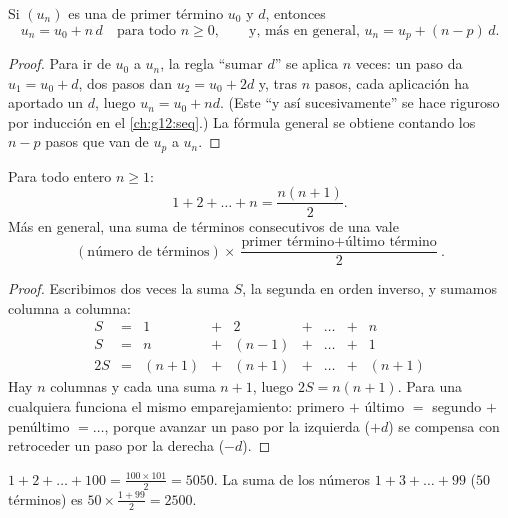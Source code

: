 \begin{theorem}\label{thm:g11:seq:arithgeneral}
Si $(u_n)$ es una  de primer término $u_0$ y
 $d$, entonces
\[
u_n = u_0 + n\,d \quad \text{para todo } n \geq 0,
\qquad\text{y, más en general, } u_n = u_p + (n - p)\,d .
\]
\end{theorem}

\begin{proof}
Para ir de $u_0$ a $u_n$, la regla ``sumar $d$'' se aplica $n$ veces: un
paso da $u_1 = u_0 + d$, dos pasos dan $u_2 = u_0 + 2d$ y, tras $n$ pasos,
cada aplicación ha aportado un $d$, luego $u_n = u_0 + nd$. (Este
``y así sucesivamente'' se hace riguroso por inducción en el
\cref{ch:g12:seq}.) La fórmula general se obtiene contando los $n - p$
pasos que van de $u_p$ a $u_n$.
\end{proof}

\begin{theorem}\label{thm:g11:seq:intsum}
Para todo entero $n \geq 1$:
\[
1 + 2 + \dots + n = \frac{n(n+1)}{2}.
\]
Más en general, una suma de términos consecutivos de una  vale
\[
(\text{número de términos}) \times
\frac{\text{primer término} + \text{último término}}{2}.
\]
\end{theorem}

\begin{proof}
Escribimos dos veces la suma $S$, la segunda en orden inverso, y sumamos
columna a columna:
\[
\begin{array}{ccccccccc}
S & = & 1 & + & 2 & + & \dots & + & n\\
S & = & n & + & (n-1) & + & \dots & + & 1\\
\hline
2S & = & (n+1) & + & (n+1) & + & \dots & + & (n+1)
\end{array}
\]
Hay $n$ columnas y cada una suma $n + 1$, luego $2S = n(n+1)$. Para una
 cualquiera funciona el mismo emparejamiento:
primero $+$ último $=$ segundo $+$ penúltimo $= \dots$, porque avanzar un
paso por la izquierda ($+d$) se compensa con retroceder un paso por la
derecha ($-d$).
\end{proof}

\begin{example}
$1 + 2 + \dots + 100 = \frac{100 \times 101}{2} = 5050$. La suma de los
números  $1 + 3 + \dots + 99$ ($50$ términos) es
$50 \times \frac{1 + 99}{2} = 2500$.
\end{example}

